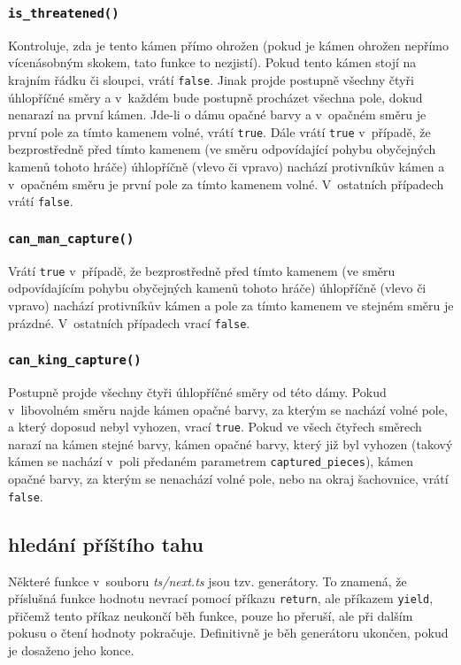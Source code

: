 \documentclass[a4paper,12pt]{article}
\begin{document}
	\subsubsection*{\texttt{is\_threatened()}}
	Kontroluje, zda je tento kámen přímo ohrožen (pokud je kámen ohrožen nepřímo vícenásobným skokem, tato
	funkce to nezjistí). Pokud tento kámen stojí na krajním řádku či sloupci, vrátí \texttt{false}. Jinak
	projde postupně všechny čtyři úhlopříčné směry a v~každém bude postupně procházet všechna pole, dokud nenarazí
	na první kámen. Jde-li o dámu opačné barvy a v~opačném směru je první pole za tímto kamenem volné, vrátí \texttt{true}.
	Dále vrátí \texttt{true} v~případě, že bezprostředně před tímto kamenem (ve směru odpovídající pohybu obyčejných
	kamenů tohoto hráče) úhlopříčně (vlevo či vpravo) nachází protivníkův kámen a v~opačném směru je první pole za tímto
	kamenem volné. V~ostatních případech vrátí \texttt{false}.
	
	\subsubsection*{\texttt{can\_man\_capture()}}
	Vrátí \texttt{true} v~případě, že bezprostředně před tímto kamenem (ve směru odpovídajícím pohybu obyčejných
	kamenů tohoto hráče) úhlopříčně (vlevo či vpravo) nachází protivníkův kámen a pole za tímto kamenem ve stejném
	směru je prázdné. V~ostatních případech vrací \texttt{false}.
	
	\subsubsection*{\texttt{can\_king\_capture()}}
	Postupně projde všechny čtyři úhlopříčné směry od této dámy. Pokud v~libovolném
	směru najde kámen opačné barvy, za kterým se nachází volné pole, a který doposud nebyl
	vyhozen, vrací \texttt{true}. Pokud ve všech čtyřech směrech narazí na kámen stejné
	barvy, kámen opačné barvy, který již byl vyhozen (takový kámen se nachází v~poli předaném
	parametrem \texttt{captured\_pieces}), kámen opačné barvy, za kterým se nenachází volné
	pole, nebo na okraj šachovnice, vrátí \texttt{false}.
	
	\subsection{hledání příštího tahu}
	Některé funkce v~souboru \textit{ts/next.ts} jsou tzv. generátory. To znamená,
	že příslušná funkce hodnotu nevrací pomocí příkazu \texttt{return}, ale příkazem
	\texttt{yield}, přičemž tento příkaz neukončí běh funkce, pouze ho přeruší, ale při
	dalším pokusu o čtení hodnoty pokračuje. Definitivně je běh generátoru ukončen,
	pokud je dosaženo jeho konce.
	
\end{document}
